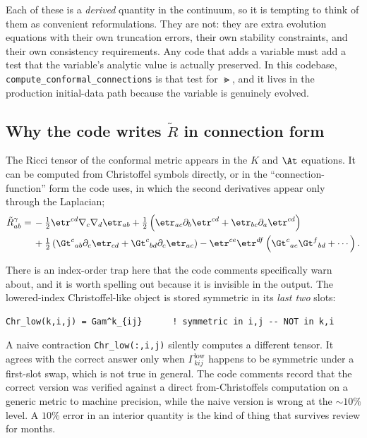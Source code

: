 \gotcha
Each of these is a \emph{derived} quantity in the continuum, so it is tempting
to think of them as convenient reformulations. They are not: they are extra
evolution equations with their own truncation errors, their own stability
constraints, and their own consistency requirements. Any code that adds a
variable must add a test that the variable's analytic value is actually
preserved. In this codebase, \texttt{compute\_conformal\_connections} is that
test for $\Gt$, and it lives in the production initial-data path because the
variable is genuinely evolved.

\subsection{Why the code writes $\tilde{R}$ in connection form}

The Ricci tensor of the conformal metric appears in the $K$ and $\At$
equations. It can be computed from Christoffel symbols directly, or in the
``connection-function'' form the code uses, in which the second derivatives
appear only through the Laplacian;
\begin{align}
\tilde{R}^\gamma_{ab} = \, & -\tfrac{1}{2}\etr^{cd}\nabla_c\nabla_d\etr_{ab}
  + \tfrac{1}{2}\left(\etr_{ac}\partial_b\etr^{cd}
      + \etr_{bc}\partial_a\etr^{cd}\right) \notag\\
  & + \tfrac{1}{2}\left(\Gt^c{}_{ab}\partial_c\etr_{cd}
      + \Gt^c{}_{bd}\partial_c\etr_{ac}\right)
  - \etr^{ce}\etr^{df}\left(\Gt^c{}_{ae}\Gt^f{}_{bd}
      + \cdots\right).
\end{align}

\gotcha
There is an index-order trap here that the code comments specifically warn
about, and it is worth spelling out because it is invisible in the output.
The lowered-index Christoffel-like object is stored symmetric in its
\emph{last two} slots:
\begin{lstlisting}
Chr_low(k,i,j) = Gam^k_{ij}      ! symmetric in i,j -- NOT in k,i
\end{lstlisting}
A naive contraction \texttt{Chr\_low(:,i,j)} silently computes a different
tensor. It agrees with the correct answer only when $\Gamma^{\mathrm{low}}_{kij}$ happens to be
symmetric under a first-slot swap, which is not true in general. The code
comments record that the correct version was verified against a direct
from-Christoffels computation on a generic metric to machine precision, while
the naive version is wrong at the $\sim 10\%$ level. A $10\%$ error in an
interior quantity is the kind of thing that survives review for months.

